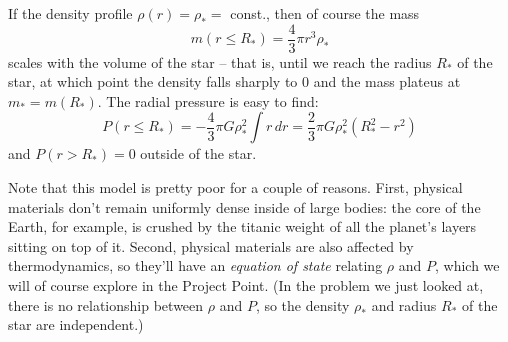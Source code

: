 \documentclass[11pt]{article}
\begin{document}
\begin{enumerate}
\hspace{15pt} If the density profile $\rho(r) = \rho_* =$ const., then of course the mass
\[ m(r \leq R_*) = \frac{4}{3}\pi r^3 \rho_* \]
scales with the volume of the star -- that is, until we reach the radius $R_*$ of the star, at which point the density falls sharply to 0 and the mass plateus at $m_* = m(R_*)$. The radial pressure is easy to find:
\[ P(r\leq R_*) = -\frac{4}{3}\pi G\rho^2_* \int r\,dr = \frac{2}{3}\pi G\rho^2_*(R^2_* - r^2) \]
and $P(r>R_*) = 0$ outside of the star.

\hspace{15pt} Note that this model is pretty poor for a couple of reasons. First, physical materials don't remain uniformly dense inside of large bodies: the core of the Earth, for example, is crushed by the titanic weight of all the planet's layers sitting on top of it. Second, physical materials are also affected by thermodynamics, so they'll have an \textit{equation of state} relating $\rho$ and $P$, which we will of course explore in the Project Point. (In the problem we just looked at, there is no relationship between $\rho$ and $P$, so the density $\rho_*$ and radius $R_*$ of the star are independent.)

\end{enumerate}
\end{document}
